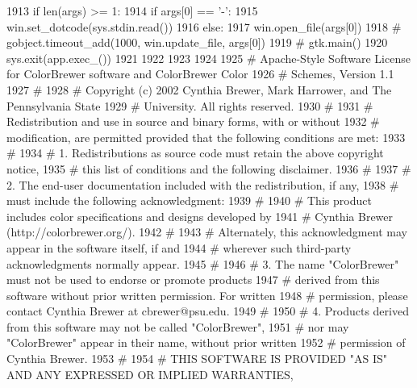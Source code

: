 \begin{DoxyCode}
{{1913     \textcolor{keywordflow}{if} len(args) >= 1:
1914         \textcolor{keywordflow}{if} args[0] == \textcolor{stringliteral}{'-'}:
1915             win.set\_dotcode(sys.stdin.read())
1916         \textcolor{keywordflow}{else}:
1917             win.open\_file(args[0])
1918 \textcolor{comment}{#            gobject.timeout\_add(1000, win.update\_file, args[0])}
1919 \textcolor{comment}{#    gtk.main()}
1920     sys.exit(app.exec\_())
1921 
1922 
1923 
1924 
1925 \textcolor{comment}{# Apache-Style Software License for ColorBrewer software and ColorBrewer Color}
1926 \textcolor{comment}{# Schemes, Version 1.1}
1927 \textcolor{comment}{#}
1928 \textcolor{comment}{# Copyright (c) 2002 Cynthia Brewer, Mark Harrower, and The Pennsylvania State}
1929 \textcolor{comment}{# University. All rights reserved.}
1930 \textcolor{comment}{#}
1931 \textcolor{comment}{# Redistribution and use in source and binary forms, with or without}
1932 \textcolor{comment}{# modification, are permitted provided that the following conditions are met:}
1933 \textcolor{comment}{#}
1934 \textcolor{comment}{#    1. Redistributions as source code must retain the above copyright notice,}
1935 \textcolor{comment}{#    this list of conditions and the following disclaimer.}
1936 \textcolor{comment}{#}
1937 \textcolor{comment}{#    2. The end-user documentation included with the redistribution, if any,}
1938 \textcolor{comment}{#    must include the following acknowledgment:}
1939 \textcolor{comment}{#}
1940 \textcolor{comment}{#       This product includes color specifications and designs developed by}
1941 \textcolor{comment}{#       Cynthia Brewer (http://colorbrewer.org/).}
1942 \textcolor{comment}{#}
1943 \textcolor{comment}{#    Alternately, this acknowledgment may appear in the software itself, if and}
1944 \textcolor{comment}{#    wherever such third-party acknowledgments normally appear.}
1945 \textcolor{comment}{#}
1946 \textcolor{comment}{#    3. The name "ColorBrewer" must not be used to endorse or promote products}
1947 \textcolor{comment}{#    derived from this software without prior written permission. For written}
1948 \textcolor{comment}{#    permission, please contact Cynthia Brewer at cbrewer@psu.edu.}
1949 \textcolor{comment}{#}
1950 \textcolor{comment}{#    4. Products derived from this software may not be called "ColorBrewer",}
1951 \textcolor{comment}{#    nor may "ColorBrewer" appear in their name, without prior written}
1952 \textcolor{comment}{#    permission of Cynthia Brewer.}
1953 \textcolor{comment}{#}
1954 \textcolor{comment}{# THIS SOFTWARE IS PROVIDED "AS IS" AND ANY EXPRESSED OR IMPLIED WARRANTIES,}
}}
\end{DoxyCode}
